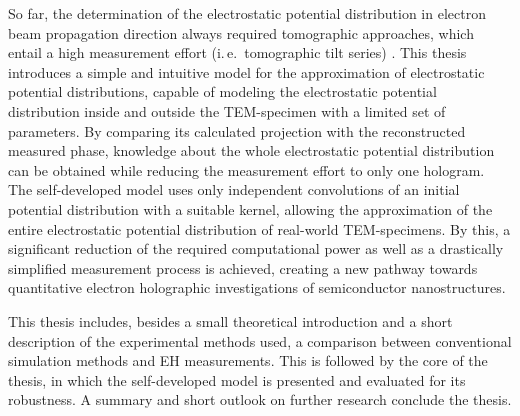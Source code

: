 So far, the determination of the electrostatic potential distribution in electron beam propagation direction always required tomographic approaches, which entail a high measurement effort (i.\,e.\ tomographic tilt series) \cite{Twitchett-Harrison2007,Scott2012,Wolf2014,Miao2016,Yalisove2021}. This thesis introduces a simple and intuitive model for the approximation of electrostatic potential distributions, capable of modeling the electrostatic potential distribution inside and outside the TEM-specimen with a limited set of parameters. By comparing its calculated projection with the reconstructed measured phase, knowledge about the whole electrostatic potential distribution can be obtained while reducing the measurement effort to only one hologram. The self-developed model uses only independent convolutions of an initial potential distribution with a suitable kernel, allowing the approximation of the entire electrostatic potential distribution of real-world TEM-specimens. By this, a significant reduction of the required computational power as well as a drastically simplified measurement process is achieved, creating a new pathway towards quantitative electron holographic investigations of semiconductor nanostructures.

This thesis includes, besides a small theoretical introduction and a short description of the experimental methods used, a comparison between conventional simulation methods and EH measurements. This is followed by the core of the thesis, in which the self-developed model is presented and evaluated for its robustness. A summary and short outlook on further research conclude the thesis.
